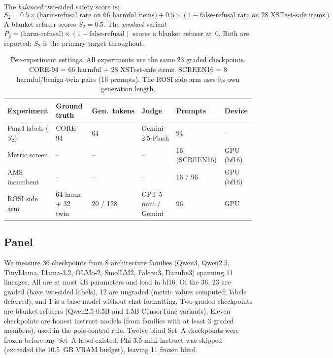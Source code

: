 \documentclass[11pt,letterpaper]{article}
\begin{document}
The \emph{balanced} two-sided safety score is:
\begin{equation}
S_2 = 0.5 \times \text{(harm-refusal rate on 66 harmful items)} +
      0.5 \times (1 - \text{false-refusal rate on 28 XSTest-safe items})
\label{eq:s2}
\end{equation}
A blanket refuser scores $S_2 = 0.5$. The \emph{product} variant
$P_2 = \text{(harm-refusal)} \times (1 - \text{false-refusal})$ scores a
blanket refuser at~0. Both are reported; $S_2$ is the primary target
throughout.

\begin{table}[!htbp]
\centering
\small
\caption{Per-experiment settings. All experiments use the same 23 graded
checkpoints. CORE-94 = 66 harmful + 28 XSTest-safe items. SCREEN16 = 8
harmful/benign-twin pairs (16 prompts). The ROSI side arm uses its own
generation length.}
\label{tab:settings}
\begin{tabular}{@{}lllllp{1.2cm}@{}}
\toprule
Experiment & Ground truth & Gen.\ tokens & Judge & Prompts & Device \\
\midrule
Panel labels ($S_2$) & CORE-94 & 64 & Gemini-2.5-Flash & 94 & -- \\
Metric screen & -- & -- & -- & 16 (SCREEN16) & GPU (bf16) \\
AMS incumbent & -- & -- & -- & 16 / 96 & GPU (bf16) \\
ROSI side arm & 64 harm + 32 twin & 20 / 128 & GPT-5-mini / Gemini & 96 & GPU \\
\bottomrule
\end{tabular}
\end{table}

\subsection{Panel}
\label{sec:panel}

We measure 36 checkpoints from 8 architecture families (Qwen3, Qwen2.5,
TinyLlama, Llama-3.2, OLMo-2, SmolLM2, Falcon3, Danube3) spanning 11
lineages. All are at most 4B parameters and load in bf16. Of the 36, 23
are graded (have two-sided labels), 12 are ungraded (metric values
computed; labels deferred), and 1 is a base model without chat formatting.
Two graded checkpoints are blanket refusers (Qwen2.5-0.5B and 1.5B
CensorTune variants). Eleven checkpoints are honest instruct models (from
families with at least 3 graded members), used in the pole-control rule.
Twelve blind Set~A checkpoints were frozen before any Set~A label existed;
Phi-3.5-mini-instruct was skipped (exceeded the 10.5~GB VRAM budget),
leaving 11 frozen blind.
\end{document}
